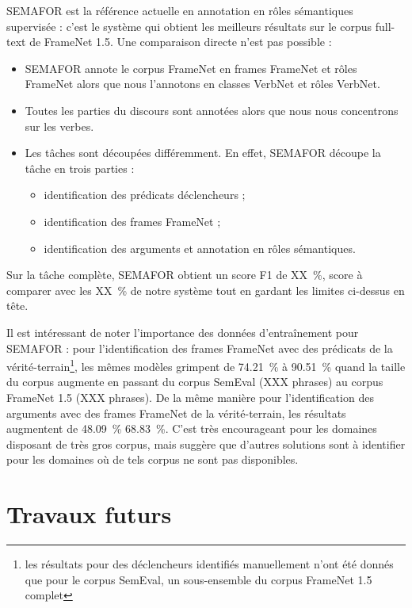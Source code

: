 SEMAFOR \citep{das2014frame} est la référence actuelle en annotation en rôles
sémantiques supervisée : c'est le système qui obtient les meilleurs résultats
sur le corpus full-text de FrameNet 1.5. Une comparaison directe n'est pas
possible :

\begin{itemize}
    \item SEMAFOR annote le corpus FrameNet en frames FrameNet et rôles
FrameNet alors que nous l'annotons en classes VerbNet et rôles VerbNet.
    \item Toutes les parties du discours sont annotées alors que nous nous
concentrons sur les verbes.
    \item Les tâches sont découpées différemment. En effet, SEMAFOR découpe la
        tâche en trois parties :
    \begin{itemize}
        \item identification des prédicats déclencheurs ;
        \item identification des frames FrameNet ;
        \item identification des arguments et annotation en rôles sémantiques.
    \end{itemize}
\end{itemize}

Sur la tâche complète, SEMAFOR obtient un score F1 de XX~\%, score à comparer
avec les XX~\% de notre système tout en gardant les limites ci-dessus en tête. 

Il est intéressant de noter l'importance des données d'entraînement pour
SEMAFOR : pour l'identification des frames FrameNet avec des prédicats de la
vérité-terrain\footnote{les résultats pour des déclencheurs identifiés
    manuellement n'ont été donnés que pour le corpus SemEval, un sous-ensemble
du corpus FrameNet 1.5 complet}, les mêmes modèles grimpent de 74.21~\% à
90.51~\% quand la taille du corpus augmente en passant du corpus SemEval (XXX
phrases) au corpus FrameNet 1.5 (XXX phrases).  De la même manière pour
l'identification des arguments avec des frames FrameNet de la vérité-terrain,
les résultats augmentent de 48.09~\% 68.83~\%. C'est très encourageant pour les
domaines disposant de très gros corpus, mais suggère que d'autres solutions
sont à identifier pour les domaines où de tels corpus ne sont pas disponibles.

\section{Travaux futurs}


